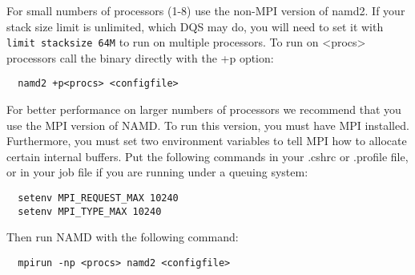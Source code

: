 For small numbers of processors (1-8) use the non-MPI version of namd2.
If your stack size limit is unlimited, which DQS may do, you will need
to set it with \verb#limit stacksize 64M# to run on multiple processors.
To run on <procs> processors call the binary directly with the +p option:

\begin{verbatim}
  namd2 +p<procs> <configfile>
\end{verbatim}

For better performance on larger numbers of processors we recommend
that you use the MPI version of NAMD.  To run this version, you must
have MPI installed.  Furthermore, you must set two environment
variables to tell MPI how to allocate certain internal buffers.  Put
the following commands in your .cshrc or .profile file, or in your
job file if you are running under a queuing system:

\begin{verbatim}
  setenv MPI_REQUEST_MAX 10240
  setenv MPI_TYPE_MAX 10240
\end{verbatim}

Then run NAMD with the following command:

\begin{verbatim}
  mpirun -np <procs> namd2 <configfile>
\end{verbatim}


